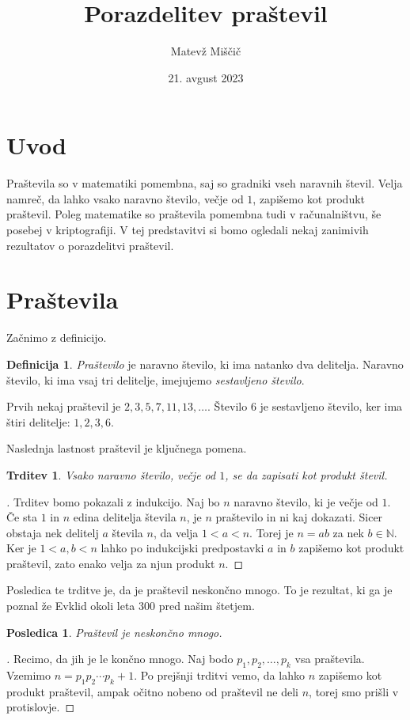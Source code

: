 \documentclass[a4paper,12pt]{article}
\title{Porazdelitev praštevil}
\author{Matevž Miščič}
\date{21. avgust 2023}
\def\N{\mathbb{N}}
\theoremstyle{definition}
\newtheorem{definicija}{Definicija}
\theoremstyle{plain}
\newtheorem{trditev}{Trditev}
\newtheorem{posledica}{Posledica}
\newenvironment{dokaz}{\begin{proof}[\bfseries\upshape\proofname]}{\end{proof}}
\begin{document}
\maketitle{}

\section{Uvod}
Praštevila so v matematiki pomembna, saj so gradniki vseh naravnih števil. Velja namreč, da lahko vsako naravno število, večje od $1$, zapišemo kot produkt praštevil. Poleg matematike so praštevila pomembna tudi v računalništvu, še posebej v kriptografiji. V tej predstavitvi si bomo ogledali nekaj zanimivih rezultatov o porazdelitvi praštevil.



\section{Praštevila}

Začnimo z definicijo.

\begin{definicija}
    \emph{Praštevilo} je naravno število, ki ima natanko dva delitelja.
    Naravno število, ki ima vsaj tri delitelje, imejujemo \emph{sestavljeno število}.
\end{definicija}
Prvih nekaj praštevil je $2, 3, 5, 7, 11, 13, \ldots$. Število $6$ je sestavljeno število, ker ima štiri delitelje: $1, 2, 3, 6$.

Naslednja lastnost praštevil je ključnega pomena.

\begin{trditev}
    \label{factorisation}
    Vsako naravno število, večje od $1$, se da zapisati kot produkt števil.
\end{trditev}
\begin{dokaz}
    Trditev bomo pokazali z indukcijo. Naj bo $n$ naravno število, ki je večje od $1$. Če sta $1$ in $n$ edina delitelja števila $n$, je $n$ praštevilo in ni kaj dokazati. Sicer obstaja nek delitelj $a$ števila $n$, da velja $1 < a < n$. Torej je $n = ab$ za nek $b \in \N$. Ker je $1 < a, b < n$ lahko po indukcijski predpostavki $a$ in $b$ zapišemo kot produkt praštevil, zato enako velja za njun produkt $n$.
\end{dokaz}

Posledica te trditve je, da je praštevil neskončno mnogo. To je rezultat, ki ga je poznal že Evklid okoli leta 300 pred našim štetjem.

\begin{posledica}
    Praštevil je neskončno mnogo.
\end{posledica}
\begin{dokaz}
    Recimo, da jih je le končno mnogo. Naj bodo $p_1, p_2, \ldots, p_k$ vsa praštevila. Vzemimo $n = p_1p_2 \cdots p_k + 1$. Po prejšnji trditvi vemo, da lahko $n$ zapišemo kot produkt praštevil, ampak očitno nobeno od praštevil ne deli $n$, torej smo prišli v protislovje.
\end{dokaz}
\end{document}
